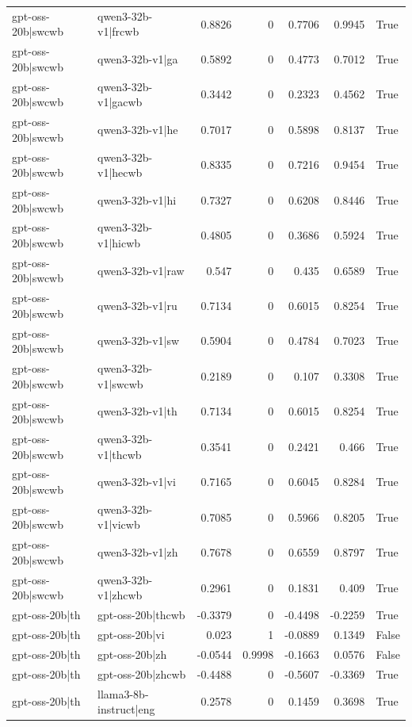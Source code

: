 \begin{table}
\begin{tabular}{l l r r r r l}
gpt-oss-20b|swcwb & qwen3-32b-v1|frcwb & 0.8826 & 0 & 0.7706 & 0.9945 & True \\
gpt-oss-20b|swcwb & qwen3-32b-v1|ga & 0.5892 & 0 & 0.4773 & 0.7012 & True \\
gpt-oss-20b|swcwb & qwen3-32b-v1|gacwb & 0.3442 & 0 & 0.2323 & 0.4562 & True \\
gpt-oss-20b|swcwb & qwen3-32b-v1|he & 0.7017 & 0 & 0.5898 & 0.8137 & True \\
gpt-oss-20b|swcwb & qwen3-32b-v1|hecwb & 0.8335 & 0 & 0.7216 & 0.9454 & True \\
gpt-oss-20b|swcwb & qwen3-32b-v1|hi & 0.7327 & 0 & 0.6208 & 0.8446 & True \\
gpt-oss-20b|swcwb & qwen3-32b-v1|hicwb & 0.4805 & 0 & 0.3686 & 0.5924 & True \\
gpt-oss-20b|swcwb & qwen3-32b-v1|raw & 0.547 & 0 & 0.435 & 0.6589 & True \\
gpt-oss-20b|swcwb & qwen3-32b-v1|ru & 0.7134 & 0 & 0.6015 & 0.8254 & True \\
gpt-oss-20b|swcwb & qwen3-32b-v1|sw & 0.5904 & 0 & 0.4784 & 0.7023 & True \\
gpt-oss-20b|swcwb & qwen3-32b-v1|swcwb & 0.2189 & 0 & 0.107 & 0.3308 & True \\
gpt-oss-20b|swcwb & qwen3-32b-v1|th & 0.7134 & 0 & 0.6015 & 0.8254 & True \\
gpt-oss-20b|swcwb & qwen3-32b-v1|thcwb & 0.3541 & 0 & 0.2421 & 0.466 & True \\
gpt-oss-20b|swcwb & qwen3-32b-v1|vi & 0.7165 & 0 & 0.6045 & 0.8284 & True \\
gpt-oss-20b|swcwb & qwen3-32b-v1|vicwb & 0.7085 & 0 & 0.5966 & 0.8205 & True \\
gpt-oss-20b|swcwb & qwen3-32b-v1|zh & 0.7678 & 0 & 0.6559 & 0.8797 & True \\
gpt-oss-20b|swcwb & qwen3-32b-v1|zhcwb & 0.2961 & 0 & 0.1831 & 0.409 & True \\
gpt-oss-20b|th & gpt-oss-20b|thcwb & -0.3379 & 0 & -0.4498 & -0.2259 & True \\
gpt-oss-20b|th & gpt-oss-20b|vi & 0.023 & 1 & -0.0889 & 0.1349 & False \\
gpt-oss-20b|th & gpt-oss-20b|zh & -0.0544 & 0.9998 & -0.1663 & 0.0576 & False \\
gpt-oss-20b|th & gpt-oss-20b|zhcwb & -0.4488 & 0 & -0.5607 & -0.3369 & True \\
gpt-oss-20b|th & llama3-8b-instruct|eng & 0.2578 & 0 & 0.1459 & 0.3698 & True \\

\end{tabular}
\end{table}
